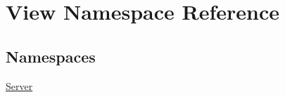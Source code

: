 \hypertarget{namespace_view}{}\section{View Namespace Reference}
\label{namespace_view}
\subsection*{Namespaces}
\begin{DoxyCompactItemize}
\item 
 \hyperlink{namespace_view_1_1_server}{Server}
\end{DoxyCompactItemize}
